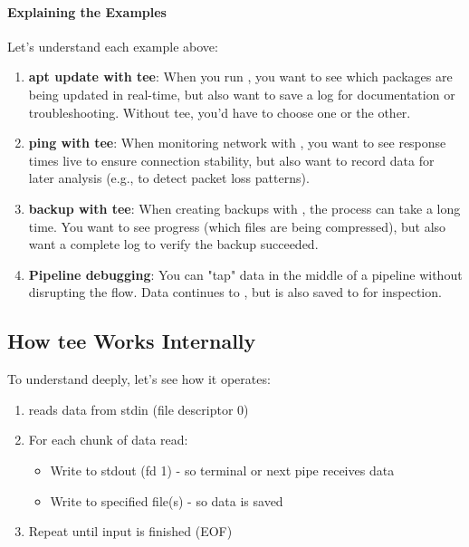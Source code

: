 \paragraph{Explaining the Examples}

Let's understand each example above:

\begin{enumerate}
	\item \textbf{apt update with tee}: When you run , you want to see which packages are being updated in real-time, but also want to save a log for documentation or troubleshooting. Without tee, you'd have to choose one or the other.

	\item \textbf{ping with tee}: When monitoring network with , you want to see response times live to ensure connection stability, but also want to record data for later analysis (e.g., to detect packet loss patterns).

	\item \textbf{backup with tee}: When creating backups with , the process can take a long time. You want to see progress (which files are being compressed), but also want a complete log to verify the backup succeeded.

	\item \textbf{Pipeline debugging}: You can "tap" data in the middle of a pipeline without disrupting the flow. Data continues to , but is also saved to  for inspection.
\end{enumerate}

\subsection{How tee Works Internally}

To understand  deeply, let's see how it operates:

\begin{enumerate}
	\item {} reads data from stdin (file descriptor 0)
	\item For each chunk of data read:
	      \begin{itemize}
		      \item Write to stdout (fd 1) - so terminal or next pipe receives data
		      \item Write to specified file(s) - so data is saved
	      \end{itemize}
	\item Repeat until input is finished (EOF)
\end{enumerate}

